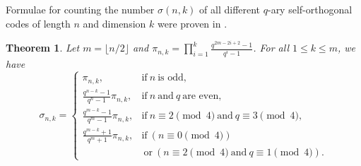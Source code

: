 \documentclass[a4paper,11pt]{article}
\newtheorem{theorem}{Theorem}
\begin{document}
Formulae for counting the number $\sigma(n,k)$ of all different $q$-ary self-orthogonal codes of length $n$ and dimension $k$
were proven in \cite{Pless_sigma}. %


\begin{theorem}\label{thm:sigma}
Let $m=\lfloor n/2\rfloor$ and $\pi_{n,k}=\prod_{i=1}^k\frac{q^{2m-2i+2}-1}{q^i-1}$. For all $1\le k\le m$, we have
\[ \sigma_{n,k}=\left\{ \begin{array}{rl}
\pi_{n,k},&\mbox{if} \ n \ \text{is odd},\\
\frac{q^{n-k}-1}{q^n-1}\pi_{n,k},&\mbox{if} \ n \ \mbox{and} \ q \ \text{are even},\\
\frac{q^{m-k}-1}{q^m-1}\pi_{n,k},&\mbox{if} \ n\equiv 2\pmod 4 \ \mbox{and} \ q\equiv 3\pmod 4,\\
\frac{q^{m-k}+1}{q^m+1}\pi_{n,k},&\mbox{if} \ (n\equiv 0\pmod 4)\\
& \ \mbox{or} \ (n\equiv 2\pmod 4 \ \mbox{and} \ q\equiv 1\pmod 4).
\end{array}\right.\]
\end{theorem}
\end{document}
